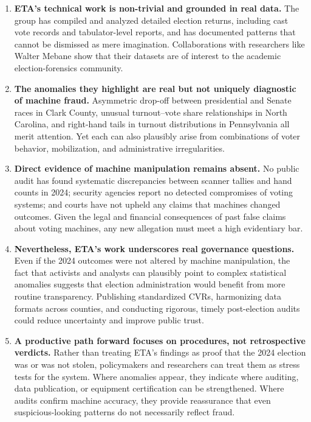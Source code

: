 \documentclass[12pt]{article}
\begin{document}
\begin{enumerate}
    \item \textbf{ETA's technical work is non-trivial and grounded in real data.} The group has compiled and analyzed detailed election returns, including cast vote records and tabulator-level reports, and has documented patterns that cannot be dismissed as mere imagination. Collaborations with researchers like Walter Mebane show that their datasets are of interest to the academic election-forensics community.

    \item \textbf{The anomalies they highlight are real but not uniquely diagnostic of machine fraud.} Asymmetric drop-off between presidential and Senate races in Clark County, unusual turnout--vote share relationships in North Carolina, and right-hand tails in turnout distributions in Pennsylvania all merit attention. Yet each can also plausibly arise from combinations of voter behavior, mobilization, and administrative irregularities.

    \item \textbf{Direct evidence of machine manipulation remains absent.} No public audit has found systematic discrepancies between scanner tallies and hand counts in 2024; security agencies report no detected compromises of voting systems; and courts have not upheld any claims that machines changed outcomes. Given the legal and financial consequences of past false claims about voting machines, any new allegation must meet a high evidentiary bar.

    \item \textbf{Nevertheless, ETA's work underscores real governance questions.} Even if the 2024 outcomes were not altered by machine manipulation, the fact that activists and analysts can plausibly point to complex statistical anomalies suggests that election administration would benefit from more routine transparency. Publishing standardized CVRs, harmonizing data formats across counties, and conducting rigorous, timely post-election audits could reduce uncertainty and improve public trust.

    \item \textbf{A productive path forward focuses on procedures, not retrospective verdicts.} Rather than treating ETA's findings as proof that the 2024 election was or was not stolen, policymakers and researchers can treat them as stress tests for the system. Where anomalies appear, they indicate where auditing, data publication, or equipment certification can be strengthened. Where audits confirm machine accuracy, they provide reassurance that even suspicious-looking patterns do not necessarily reflect fraud.
\end{enumerate}
\end{document}
